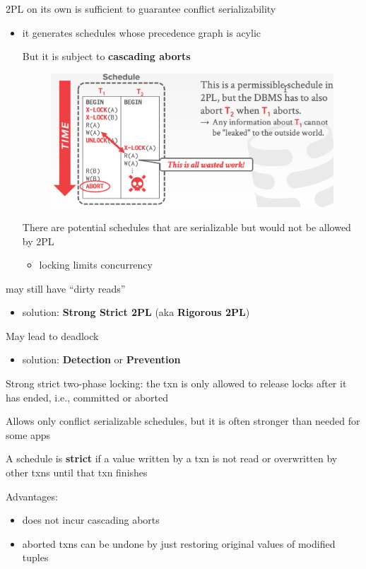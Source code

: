\documentclass[11pt]{article}
\begin{document}
2PL on its own is sufficient to guarantee conflict serializability
\begin{itemize}
\item it generates schedules whose precedence graph is acylic

But it is subject to \textbf{cascading aborts}

\begin{figure}[htbp]
\centering
\includegraphics[width=.8\textwidth]{../images/15445/59.png}
\label{}
\end{figure}

There are potential schedules that are serializable but would not be allowed by 2PL
\begin{itemize}
\item locking limits concurrency
\end{itemize}
\end{itemize}

may still have ``dirty reads''
\begin{itemize}
\item solution: \textbf{Strong Strict 2PL} (aka \textbf{Rigorous 2PL})
\end{itemize}

May lead to deadlock
\begin{itemize}
\item solution: \textbf{Detection} or \textbf{Prevention}
\end{itemize}

Strong strict two-phase locking: the txn is only allowed to release locks after it has ended,
i.e., committed or aborted

Allows only conflict serializable schedules, but it is often stronger than needed for some apps

A schedule is \textbf{strict} if a value written by a txn is not read or overwritten by other txns until
that txn finishes

Advantages:
\begin{itemize}
\item does not incur cascading aborts
\item aborted txns can be undone by just restoring original values of modified tuples
\end{itemize}
\end{document}
